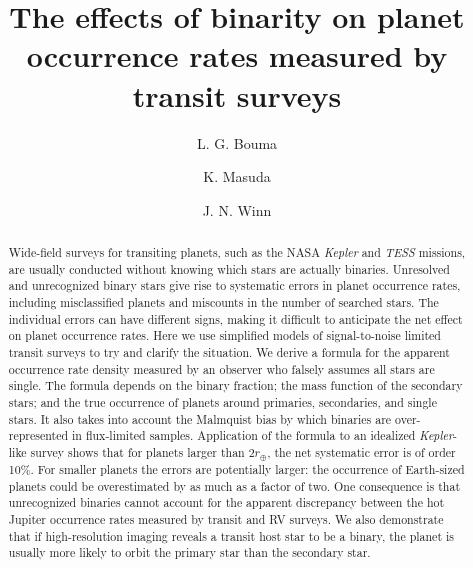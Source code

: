 \documentclass[12pt,modern]{aastex61}
\begin{document}
    
\title{ The effects of binarity on planet occurrence rates measured by transit 
surveys}
%
%
\author{L. G. Bouma}
\author{K. Masuda}
\author{J. N. Winn}
%
%
\begin{abstract}
%
Wide-field surveys for transiting planets, such as the NASA {\it Kepler}
and {\it TESS} missions, are usually conducted without knowing which stars
are actually binaries. Unresolved and unrecognized binary stars give rise to 
systematic errors in planet occurrence rates, including misclassified planets 
and miscounts in the number of searched stars. The individual errors can have 
different signs, making it difficult to anticipate the net effect on planet 
occurrence rates. Here we use simplified models of signal-to-noise limited 
transit surveys to try and clarify the situation. We derive a formula for the 
apparent occurrence rate density measured by an observer who falsely assumes 
all stars are single. The formula depends on the binary fraction; the 
mass function of the secondary stars; and the true occurrence of planets 
around primaries, secondaries, and single stars. It also takes into account 
the Malmquist bias by which binaries are over-represented in flux-limited 
samples. Application of the formula to an idealized {\it Kepler}-like survey 
shows that for planets larger than $2r_\oplus$, the net systematic error is of 
order 10\%. For smaller planets the errors are potentially larger: the 
occurrence of Earth-sized planets could be overestimated by as much as a 
factor of two. One consequence is that unrecognized binaries cannot account 
for the apparent discrepancy between the hot Jupiter occurrence rates measured 
by transit and RV surveys. We also demonstrate that if high-resolution imaging 
reveals a transit host star to be a binary, the planet is usually more likely 
to orbit the primary star than the secondary star.
%
\end{abstract}
%
%
%

%
\end{document}
